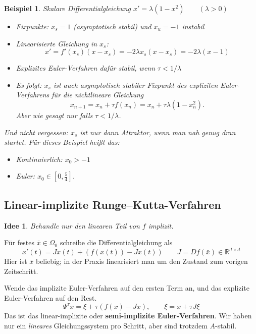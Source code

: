 \documentclass[german]{scrreprt}
\newcommand{\begriff}[1]{\textbf{#1}}
\newcommand{\R}{\mathbb R}
\theoremstyle{plain}
\theoremstyle{nonumberplain}
\theoremstyle{nonumberplain}
\newtheorem{bsp}{Beispiel}
\newtheorem{idea}{Idee}
\theoremstyle{nonumberplain}
\begin{document}
\begin{bsp}
	Skalare Differentialgleichung $x' = \lambda(1-x^2) \qquad (\lambda > 0)$
	\begin{itemize}
		\item Fixpunkte: $ x_s = 1$ (asymptotisch stabil) und $x_u = -1$ instabil	
		\item Linearisierte Gleichung in $x_s$:
		\begin{equation*}
		x' = f'(x_s)(x-x_s) = -2\lambda x_s(x-x_s) = -2\lambda(x-1)
		\end{equation*}
		\item Explizites Euler-Verfahren dafür stabil, wenn $\tau< 1/\lambda$
		\item Es folgt: $x_s$ ist auch asymptotisch stabiler Fixpunkt des expliziten Euler-Verfahrens für die nichtlineare Gleichung
		\begin{equation*}
		x_{n+1} = x_n + \tau f(x_n) = x_n + \tau\lambda(1-x_n^2).
		\end{equation*}
		Aber wie gesagt nur falls $\tau< 1/\lambda$.
	\end{itemize}
	Und nicht vergessen: $x_s$ ist nur dann Attraktor, wenn man nah genug dran startet. Für dieses Beispiel heißt das:
	\begin{itemize}
		\item Kontinuierlich: $x_0>-1$
		\item Euler: $x_0\in[0, \frac{5}{4}]$.
	\end{itemize}
\end{bsp}

\subsection{Linear-implizite Runge--Kutta-Verfahren}

\begin{idea}
	Behandle nur den linearen Teil von $f$ implizit.
\end{idea}

Für festes $\bar{x} \in \Omega_0$ schreibe die Differentialgleichung als
\begin{equation*}
x'(t) = Jx(t) + (f(x(t)) - Jx(t)) \qquad J=Df(\bar{x})\in\R^{d\times d}
\end{equation*}
Hier ist $\bar{x}$ beliebig; in der Praxis linearisiert man um den Zustand
zum vorigen Zeitschritt.

Wende das implizite Euler-Verfahren auf den ersten Term an, und das explizite Euler-Verfahren auf den Rest.
\begin{equation*}
\Psi^\tau x = \xi + \tau(f(x)-Jx),\qquad \xi = x+\tau J\xi
\end{equation*}
Das ist das linear-implizite oder \begriff{semi-implizite Euler-Verfahren}.
Wir haben nur ein \textit{lineares} Gleichungssystem pro Schritt, aber sind trotzdem $A$-stabil.
\end{document}
